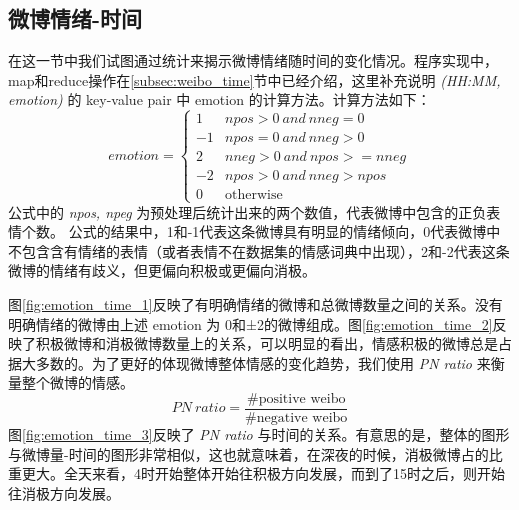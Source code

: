 \documentclass[12pt, oneside]{article}
\begin{document}
\begin{spacing}{1.5}
\begin{CJK}{UTF8}{gbsn}
\subsection{微博情绪-时间}
\label{subsec:emotion_time}
在这一节中我们试图通过统计来揭示微博情绪随时间的变化情况。程序实现中，map和reduce操作在\ref{subsec:weibo_time}节中已经介绍，这里补充说明 {\it(HH:MM, emotion)} 的 key-value pair 中 emotion 的计算方法。计算方法如下：
$$
emotion = 
\begin{cases}
1 & npos > 0~and~nneg = 0 \\
-1 & npos = 0~and~nneg > 0 \\
2 & nneg > 0~and~npos >= nneg \\
-2 & npos > 0~and~nneg > npos \\
0 & \text{otherwise}
\end{cases}
$$
公式中的 {\it npos, npeg} 为预处理后统计出来的两个数值，代表微博中包含的正负表情个数。 公式的结果中，1和-1代表这条微博具有明显的情绪倾向，0代表微博中不包含含有情绪的表情（或者表情不在数据集的情感词典中出现），2和-2代表这条微博的情绪有歧义，但更偏向积极或更偏向消极。

图\ref{fig:emotion_time_1}反映了有明确情绪的微博和总微博数量之间的关系。没有明确情绪的微博由上述 emotion 为 0和±2的微博组成。图\ref{fig:emotion_time_2}反映了积极微博和消极微博数量上的关系，可以明显的看出，情感积极的微博总是占据大多数的。为了更好的体现微博整体情感的变化趋势，我们使用 {\it PN ratio} 来衡量整个微博的情感。
$$PN~ratio = \frac{\text{\#positive weibo}}{\text{\#negative weibo}}$$
图\ref{fig:emotion_time_3}反映了 {\it PN ratio} 与时间的关系。有意思的是，整体的图形与微博量-时间的图形非常相似，这也就意味着，在深夜的时候，消极微博占的比重更大。全天来看，4时开始整体开始往积极方向发展，而到了15时之后，则开始往消极方向发展。


\end{CJK}
\end{spacing}
\end{document}
